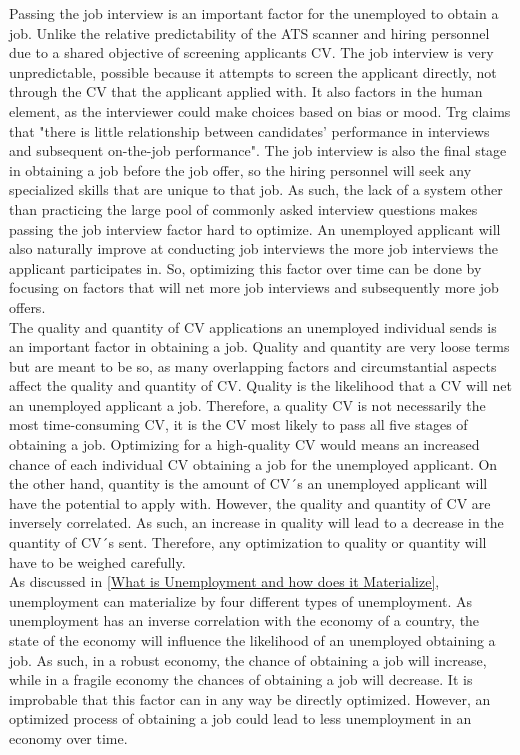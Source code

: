 Passing the job interview is an important factor for the unemployed to obtain a job.
Unlike the relative predictability of the ATS scanner and hiring personnel due to a shared objective of screening applicants CV.
The job interview is very unpredictable, possible because it attempts to screen the applicant directly, not through the CV that the applicant applied with.
It also factors in the human element, as the interviewer could make choices based on bias or mood.
Trg claims that "there is little relationship between candidates’ performance in interviews and subsequent on-the-job performance".\cite{Job_Interview}
The job interview is also the final stage in obtaining a job before the job offer, so the hiring personnel will seek any specialized skills that are unique to that job.
As such, the lack of a system other than practicing the large pool of commonly asked interview questions makes passing the job interview factor hard to optimize.\cite{Job_interview_common_questions}
An unemployed applicant will also naturally improve at conducting job interviews the more job interviews the applicant participates in.
So, optimizing this factor over time can be done by focusing on factors that will net more job interviews and subsequently more job offers. \\

The quality and quantity of CV applications an unemployed individual sends is an important factor in obtaining a job.
Quality and quantity are very loose terms but are meant to be so, as many overlapping factors and circumstantial aspects affect the quality and quantity of CV.
Quality is the likelihood that a CV will net an unemployed applicant a job.
Therefore, a quality CV is not necessarily the most time-consuming CV, it is the CV most likely to pass all five stages of obtaining a job.
Optimizing for a high-quality CV would means an increased chance of each individual CV obtaining a job for the unemployed applicant.
On the other hand, quantity is the amount of CV´s an unemployed applicant will have the potential to apply with.
However, the quality and quantity of CV are inversely correlated.
As such, an increase in quality will lead to a decrease in the quantity of CV´s sent.
Therefore, any optimization to quality or quantity will have to be weighed carefully. \\

As discussed in \ref{What is Unemployment and how does it Materialize}, unemployment can materialize by four different types of unemployment.
As unemployment has an inverse correlation with the economy of a country, the state of the economy will influence the likelihood of an unemployed obtaining a job.
As such, in a robust economy, the chance of obtaining a job will increase, while in a fragile economy the chances of obtaining a job will decrease.
It is improbable that this factor can in any way be directly optimized.
However, an optimized process of obtaining a job could lead to less unemployment in an economy over time. \\


